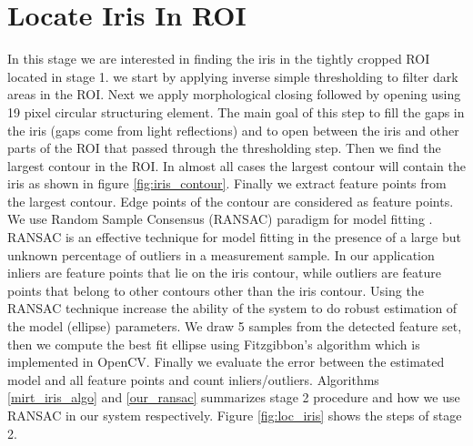 \documentclass[12pt,fleqn]{book} %
\begin{document}
\section{Locate Iris In ROI} 
In this stage we are interested in finding the iris in the tightly cropped ROI located in stage 1. we start by applying inverse simple thresholding to filter dark areas in the ROI. Next we apply morphological closing followed by opening using 19 pixel circular structuring element. The main goal of this step to fill the gaps in the iris (gaps come from light reflections) and to open between the iris and other parts of the ROI that passed through the thresholding step. Then we find the largest contour in the ROI. In almost all cases the largest contour will contain the iris as shown in figure \ref{fig:iris_contour}. Finally we extract feature points from the largest contour. Edge points of the contour are considered as feature points. We use Random Sample Consensus (RANSAC) paradigm for model fitting \cite{ransac}. RANSAC is an effective technique for model fitting in the presence of a large but unknown percentage of outliers in a measurement sample. In our application inliers are feature points that lie on the iris contour, while outliers are feature points that belong to other contours other than the iris contour. Using the RANSAC technique increase the ability of the system to do robust estimation of the model (ellipse) parameters. We draw 5 samples from the detected feature set, then we compute the best fit ellipse using Fitzgibbon’s algorithm \cite{fitzgibbon96} which is implemented in OpenCV. Finally we evaluate the error between the estimated model and all feature points and count inliers/outliers. Algorithms \ref{mirt_iris_algo} and \ref{our_ransac} summarizes stage 2 procedure and how we use RANSAC in our system respectively. Figure \ref{fig:loc_iris} shows the steps of stage 2. 
\end{document}
